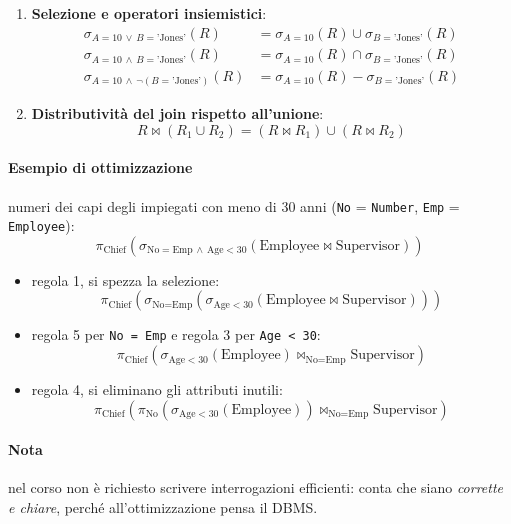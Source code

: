 \documentclass[a4paper,12pt]{article}
\begin{document}
\begin{enumerate}
    differenza.
  \item[9--11.] \textbf{Selezione e operatori insiemistici}:
    \begin{align*}
      \sigma_{A = 10 \,\vee\, B = \text{'Jones'}}(R) &=
        \sigma_{A = 10}(R) \cup \sigma_{B = \text{'Jones'}}(R)\\
      \sigma_{A = 10 \,\wedge\, B = \text{'Jones'}}(R) &=
        \sigma_{A = 10}(R) \cap \sigma_{B = \text{'Jones'}}(R)\\
      \sigma_{A = 10 \,\wedge\, \neg(B = \text{'Jones'})}(R) &=
        \sigma_{A = 10}(R) - \sigma_{B = \text{'Jones'}}(R)
    \end{align*}
  \item[12.] \textbf{Distributività del join rispetto all'unione}:
    \[ R \bowtie (R_1 \cup R_2) = (R \bowtie R_1) \cup (R \bowtie R_2) \]
\end{enumerate}

\paragraph{Esempio di ottimizzazione} numeri dei capi degli impiegati con meno
di 30 anni (\texttt{No} = \texttt{Number}, \texttt{Emp} = \texttt{Employee}):
\[
  \pi_{\text{Chief}}(\sigma_{\text{No} = \text{Emp} \,\wedge\, \text{Age} < 30}
    (\text{Employee} \bowtie \text{Supervisor}))
\]
\begin{itemize}
  \item regola 1, si spezza la selezione:
    \[ \pi_{\text{Chief}}(\sigma_{\text{No} = \text{Emp}}
       (\sigma_{\text{Age} < 30}(\text{Employee} \bowtie \text{Supervisor}))) \]
  \item regola 5 per \texttt{No = Emp} e regola 3 per \texttt{Age < 30}:
    \[ \pi_{\text{Chief}}(\sigma_{\text{Age} < 30}(\text{Employee})
       \bowtie_{\text{No} = \text{Emp}} \text{Supervisor}) \]
  \item regola 4, si eliminano gli attributi inutili:
    \[ \pi_{\text{Chief}}(\pi_{\text{No}}(\sigma_{\text{Age} < 30}
       (\text{Employee})) \bowtie_{\text{No} = \text{Emp}} \text{Supervisor}) \]
\end{itemize}

\paragraph{Nota} nel corso non è richiesto scrivere interrogazioni efficienti:
conta che siano \emph{corrette e chiare}, perché all'ottimizzazione pensa il
DBMS.
\end{document}

